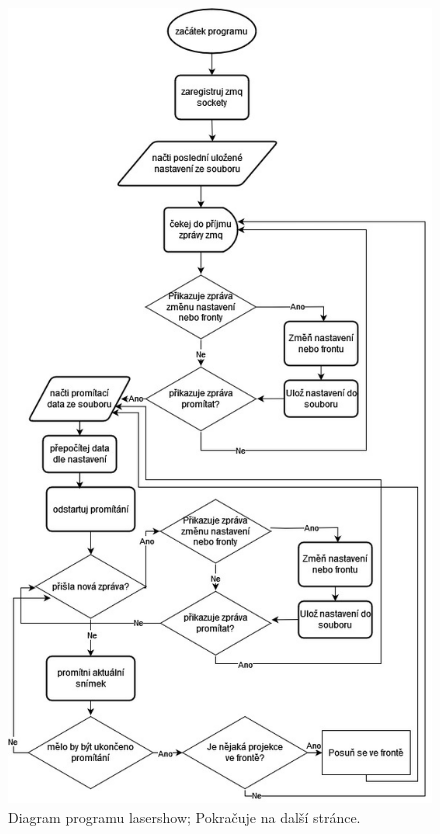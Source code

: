 \begin{figure}[H]
  \centering
  \includegraphics[width=\textwidth{}, trim=0 600 0 0, clip]{img/lasershow_flowchart.jpg}
  \caption{\label{fig:lasershow-flowchart} Diagram programu lasershow; Pokračuje na další stránce.}
\end{figure}
\clearpage

